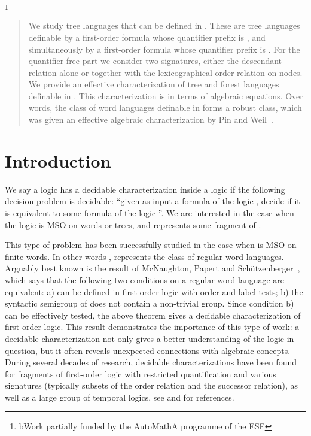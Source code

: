 \documentclass{LMCS}
\begin{document}
\author[L.~Segoufin]{Luc Segoufin\rsuper b}	\address{{\lsuper b}INRIA - LSV}
\thanks{{\lsuper b}Work partially funded by the AutoMathA
programme of the ESF}	

\begin{abstract}
  We study tree languages that can be defined in . These are tree
  languages definable by a first-order formula whose quantifier prefix is
  , and simultaneously by a first-order formula whose
  quantifier prefix is . For the quantifier free part we
  consider two signatures, either the descendant relation alone or together
  with the lexicographical order relation on nodes. We provide an effective
  characterization of tree and forest languages
  definable in . This characterization is in terms of algebraic
  equations. Over words, the class of word languages definable in 
  forms a robust class, which was given an effective algebraic characterization
  by Pin and Weil~\cite{weilpinpoly}.
\end{abstract}

\maketitle

\section{Introduction}

We say a logic  has a decidable characterization inside a logic  if the following
decision problem is decidable: ``given as input a formula of the logic ,
decide if it is equivalent to some formula of the logic ''. We are interested in the case when the logic  is MSO on words or trees, and  represents some fragment of . 

This type of problem has been successfully studied in the case when  is
MSO on finite words. In other words , represents the class of regular
word languages.  Arguably best known is the result of McNaughton, Papert and
Sch\"utzenberger~\cite{schutzenberger,mcnaughton}, which says that the
following two conditions on a regular word language  are equivalent: a) 
can be defined in first-order logic with order and label tests; b) the
syntactic semigroup of  does not contain a non-trivial group. Since
condition b) can be effectively tested, the above theorem gives a decidable
characterization of first-order logic. This result demonstrates the importance
of this type of work: a decidable characterization not only gives a better
understanding of the logic in question, but it often reveals unexpected
connections with algebraic concepts.  During several decades of research,
decidable characterizations have been found for fragments of first-order logic
with restricted quantification and various signatures (typically subsets of the
order relation and the successor relation), as well as a large group of
temporal logics, see \cite{pin-survey} and \cite{wilke} for references.
\end{document}
